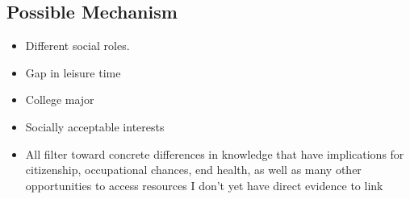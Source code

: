 \documentclass[]{article}
\begin{document}
\subsection{Possible Mechanism}

\begin{itemize}
  \item{Different social roles.}
  \item{Gap in leisure time}
  \item{College major}
  \item{Socially acceptable interests}
  \item{All filter toward concrete differences in knowledge that have implications for citizenship, occupational chances, end health, as well as many other opportunities to access resources I don't yet have direct evidence to link}
\end{itemize}
\end{document}
